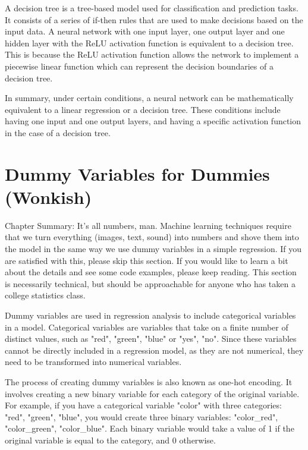 A decision tree is a tree-based model used for classification and prediction tasks. It consists of a series of if-then rules that are used to make decisions based on the input data. A neural network with one input layer, one output layer and one hidden layer with the ReLU activation  function is equivalent to a decision tree. This is because the ReLU activation function allows the network to implement a piecewise linear function which can represent the decision boundaries of a decision tree.

In summary, under certain conditions, a neural network can be mathematically equivalent to a linear regression or a decision tree. These conditions include having one input and one output layers, and having a specific activation function in the case of a decision tree.

\section{Dummy Variables for Dummies (Wonkish)} 

Chapter Summary: It's all numbers, man. Machine learning techniques require that we turn everything (images, text, sound) into numbers and shove them into the model in the same way we use dummy variables in a simple regression. If you are satisfied with this, please skip this section. If you would like to learn a bit about the details and see some code examples, please keep reading. This section is necessarily technical, but should be approachable for anyone who has taken a college statistics class.  



Dummy variables are used in regression analysis to include categorical variables in a model. Categorical variables are variables that take on a finite number of distinct values, such as "red", "green", "blue" or "yes", "no". Since these variables cannot be directly included in a regression model, as they are not numerical, they need to be transformed into numerical variables.

The process of creating dummy variables is also known as one-hot encoding. It involves creating a new binary variable for each category of the original variable. For example, if you have a categorical variable "color" with three categories: "red", "green", "blue", you would create three binary variables: "color\_red", "color\_green", "color\_blue". Each binary variable would take a value of 1 if the original variable is equal to the category, and 0 otherwise.

